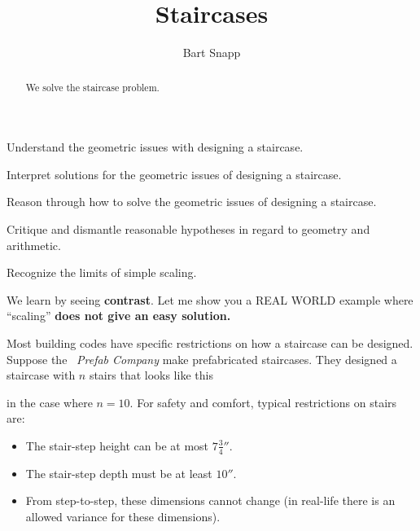 \documentclass[noauthor,nooutcomes,handout,12pt]{ximera}
\title{Staircases}
\author{Bart Snapp}
\begin{document}
\begin{abstract}
  We solve the staircase problem.
\end{abstract}
\maketitle

\begin{listOutcomes}
\item{Understand the geometric issues with designing a staircase.}
\item{Interpret solutions for the geometric issues of designing a staircase.}
\item{Reason through how to solve the geometric issues of designing a staircase.}
\item{Critique and dismantle reasonable hypotheses in regard to geometry and arithmetic.}
\item{Recognize the limits of simple scaling.}
\end{listOutcomes}

We learn by seeing \textbf{contrast}. Let me show you a REAL WORLD
example where ``scaling'' \textbf{does not give an easy solution.}


Most building codes have specific restrictions on how a staircase can
be designed. Suppose the \mooculus~\textit{Prefab Company} make
prefabricated staircases. They designed a staircase with $n$ stairs
that looks like this
\begin{center}
\end{center}
in the case where $n=10$. For safety and comfort, typical restrictions
on stairs are:
\begin{itemize}
\item The stair-step height can be at most $7\frac{3}{4}''$. 
\item The stair-step depth must be at least $10''$.
\item From step-to-step, these dimensions cannot change (in real-life there is
an allowed variance for these dimensions).
\end{itemize}
\end{document}
